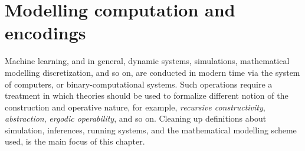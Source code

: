\chapter{Modelling computation and encodings}

Machine learning, and in general, dynamic systems, simulations, mathematical modelling discretization, and so on, are conducted in modern time via the system of computers, or binary-computational systems. Such operations require a treatment in which theories should be used to formalize different notion of the construction and operative nature, for example, \textit{recursive constructivity}, \textit{abstraction}, \textit{ergodic operability}, and so on. Cleaning up definitions about simulation, inferences, running systems, and the mathematical modelling scheme used, is the main focus of this chapter. 




